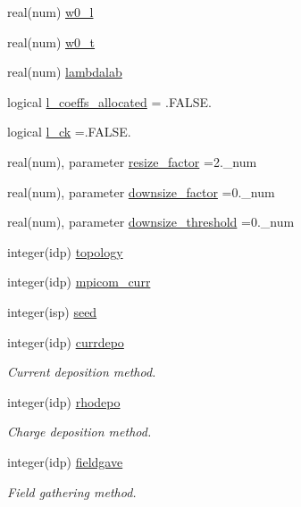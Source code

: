 \begin{DoxyCompactItemize}
real(num) \hyperlink{namespaceparams_a099f9a730e6ea2a9410eb86769458372}{w0\+\_\+l}
\item 
real(num) \hyperlink{namespaceparams_a7a94c587421680abbe506082d28ff8b6}{w0\+\_\+t}
\item 
real(num) \hyperlink{namespaceparams_a24b22ed48dbf0d3d0f582e6db7d40a76}{lambdalab}
\item 
logical \hyperlink{namespaceparams_abbe8f0ac16d41f275328feb0a5d63fed}{l\+\_\+coeffs\+\_\+allocated} = .F\+A\+L\+S\+E.
\item 
logical \hyperlink{namespaceparams_a7e70ec0bfba23188ddeb3004e464a69b}{l\+\_\+ck} =.F\+A\+L\+S\+E.
\item 
real(num), parameter \hyperlink{namespaceparams_a70195e670ef122bc4f91d74793b68621}{resize\+\_\+factor} =2.\+\_\+num
\item 
real(num), parameter \hyperlink{namespaceparams_a1e70b45a865ed6ef7927e0b49669a567}{downsize\+\_\+factor} =0.\+\_\+num
\item 
real(num), parameter \hyperlink{namespaceparams_aa81c22d18e165451716c4b23ea6fbdb1}{downsize\+\_\+threshold} =0.\+\_\+num
\item 
integer(idp) \hyperlink{namespaceparams_a259d1ed7155ef66db12c877a797fc0f0}{topology}
\item 
integer(idp) \hyperlink{namespaceparams_a5e7c931ca55f3ac5e5171dc97c3269b1}{mpicom\+\_\+curr}
\item 
integer(isp) \hyperlink{namespaceparams_ae32095407c8380779cfc1562a62d15e3}{seed}
\item 
integer(idp) \hyperlink{namespaceparams_af4ccf29a8c1f3a8a47f08f5cbbcd30eb}{currdepo}
\begin{DoxyCompactList}\small\item\em Current deposition method. \end{DoxyCompactList}\item 
integer(idp) \hyperlink{namespaceparams_ae892561d7462a1e54b9b6b2bbe1adc4c}{rhodepo}
\begin{DoxyCompactList}\small\item\em Charge deposition method. \end{DoxyCompactList}\item 
integer(idp) \hyperlink{namespaceparams_afd98a17f8dde6a4f7d4e7b0efb7384ea}{fieldgave}
\begin{DoxyCompactList}\small\item\em Field gathering method. \end{DoxyCompactList}\item 

\end{DoxyCompactItemize}
